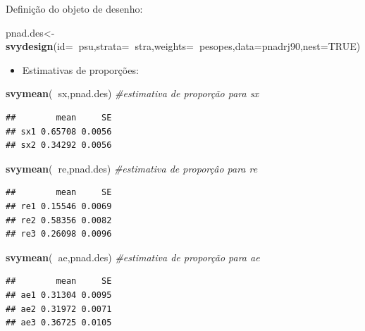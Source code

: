 \documentclass[]{book}
\newenvironment{Shaded}{\begin{snugshade}}{\end{snugshade}}
\newcommand{\KeywordTok}[1]{\textcolor[rgb]{0.13,0.29,0.53}{\textbf{#1}}}
\newcommand{\DataTypeTok}[1]{\textcolor[rgb]{0.13,0.29,0.53}{#1}}
\newcommand{\CommentTok}[1]{\textcolor[rgb]{0.56,0.35,0.01}{\textit{#1}}}
\newcommand{\OtherTok}[1]{\textcolor[rgb]{0.56,0.35,0.01}{#1}}
\newcommand{\OperatorTok}[1]{\textcolor[rgb]{0.81,0.36,0.00}{\textbf{#1}}}
\newcommand{\NormalTok}[1]{#1}
\providecommand{\tightlist}{%
  \setlength{\itemsep}{0pt}\setlength{\parskip}{0pt}}
\theoremstyle{definition}
\theoremstyle{definition}
\theoremstyle{definition}
\theoremstyle{remark}
\begin{document}
Definição do objeto de desenho:

\begin{Shaded}
\begin{Highlighting}[]
\NormalTok{pnad.des<-}\KeywordTok{svydesign}\NormalTok{(}\DataTypeTok{id=}\OperatorTok{~}\NormalTok{psu,}\DataTypeTok{strata=}\OperatorTok{~}\NormalTok{stra,}\DataTypeTok{weights=}\OperatorTok{~}\NormalTok{pesopes,}\DataTypeTok{data=}\NormalTok{pnadrj90,}\DataTypeTok{nest=}\OtherTok{TRUE}\NormalTok{)}
\end{Highlighting}
\end{Shaded}

\begin{itemize}
\tightlist
\item
  Estimativas de proporções:
\end{itemize}

\begin{Shaded}
\begin{Highlighting}[]
\KeywordTok{svymean}\NormalTok{(}\OperatorTok{~}\NormalTok{sx,pnad.des)         }\CommentTok{#estimativa de proporção para sx}
\end{Highlighting}
\end{Shaded}

\begin{verbatim}
##        mean     SE
## sx1 0.65708 0.0056
## sx2 0.34292 0.0056
\end{verbatim}

\begin{Shaded}
\begin{Highlighting}[]
\KeywordTok{svymean}\NormalTok{(}\OperatorTok{~}\NormalTok{re,pnad.des)         }\CommentTok{#estimativa de proporçâo para re}
\end{Highlighting}
\end{Shaded}

\begin{verbatim}
##        mean     SE
## re1 0.15546 0.0069
## re2 0.58356 0.0082
## re3 0.26098 0.0096
\end{verbatim}

\begin{Shaded}
\begin{Highlighting}[]
\KeywordTok{svymean}\NormalTok{(}\OperatorTok{~}\NormalTok{ae,pnad.des)         }\CommentTok{#estimativa de proporção para ae}
\end{Highlighting}
\end{Shaded}

\begin{verbatim}
##        mean     SE
## ae1 0.31304 0.0095
## ae2 0.31972 0.0071
## ae3 0.36725 0.0105
\end{verbatim}
\end{document}
